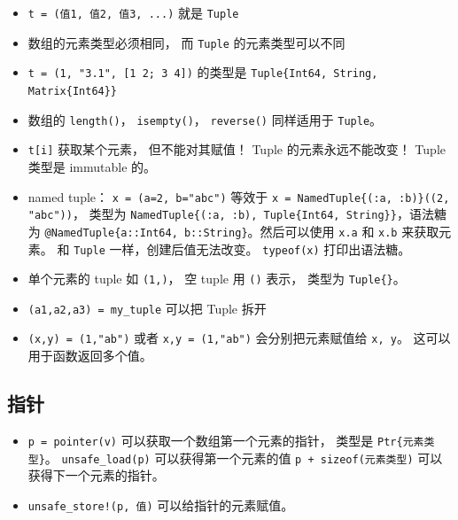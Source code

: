 \begin{itemize}
\item \verb`t = (值1, 值2, 值3, ...)` 就是 \verb`Tuple`
\item 数组的元素类型必须相同， 而 \verb`Tuple` 的元素类型可以不同
\item \verb`t = (1, "3.1", [1 2; 3 4])` 的类型是 \verb`Tuple{Int64, String, Matrix{Int64}}`
\item 数组的 \verb`length()`， \verb`isempty()`， \verb`reverse()` 同样适用于 \verb`Tuple`。
\item \verb`t[i]` 获取某个元素， 但不能对其赋值！ Tuple 的元素永远不能改变！ Tuple 类型是 immutable 的。
\item named tuple： \verb`x = (a=2, b="abc")` 等效于 \verb`x = NamedTuple{(:a, :b)}((2, "abc"))`， 类型为 \verb`NamedTuple{(:a, :b), Tuple{Int64, String}}`，语法糖为 \verb`@NamedTuple{a::Int64, b::String}`。然后可以使用 \verb`x.a` 和 \verb`x.b` 来获取元素。 和 \verb`Tuple` 一样，创建后值无法改变。 \verb`typeof(x)` 打印出语法糖。
\item 单个元素的 tuple 如 \verb`(1,)`， 空 tuple 用 \verb`()` 表示， 类型为 \verb`Tuple{}`。
\item \verb`(a1,a2,a3) = my_tuple` 可以把 Tuple 拆开
\item \verb`(x,y) = (1,"ab")` 或者 \verb`x,y = (1,"ab")` 会分别把元素赋值给 \verb`x, y`。 这可以用于函数返回多个值。
\end{itemize}

\subsection{指针}
\begin{itemize}
\item \verb`p = pointer(v)` 可以获取一个数组第一个元素的指针， 类型是 \verb`Ptr{元素类型}`。 \verb`unsafe_load(p)` 可以获得第一个元素的值 \verb`p + sizeof(元素类型)` 可以获得下一个元素的指针。
\item \verb`unsafe_store!(p, 值)` 可以给指针的元素赋值。
\end{itemize}

